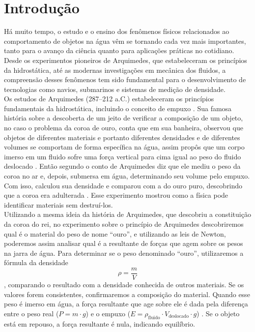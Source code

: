 \section{Introdução}

Há muito tempo, o estudo e o ensino dos fenômenos físicos relacionados ao
comportamento de objetos na água vêm se tornando cada vez mais importantes,
tanto para o avanço da ciência quanto para aplicações práticas no cotidiano.
Desde os experimentos pioneiros de Arquimedes, que estabeleceram os princípios
da hidrostática, até as modernas investigações em mecânica dos fluidos, a
compreensão desses fenômenos tem sido fundamental para o desenvolvimento de
tecnologias como navios, submarinos e sistemas de medição de densidade.\\

Os estudos de Arquimedes (287--212 a.C.) estabeleceram os princípios
fundamentais da hidrostática, incluindo o conceito de empuxo \cite{meneses2018}.
Sua famosa história sobre a descoberta de um jeito de verificar a composição de
um objeto, no caso o problema da coroa de ouro, conta que em sua banheira,
observou que objetos de diferentes materiais e portanto diferentes densidades e
de diferentes volumes se comportam de forma específica na água, assim propôs que
um corpo imerso em um fluido sofre uma força vertical para cima igual ao peso do
fluido deslocado \cite{nussenzveig2014}. Então segundo o conto de Arquimedes diz
que ele mediu o peso da coroa no ar e, depois, submersa em água, determinando
seu volume pelo empuxo. Com isso, calculou sua densidade e comparou com a do
ouro puro, descobrindo que a coroa era adulterada \cite{thompson2008}. Esse
experimento mostrou como a física pode identificar materiais sem destruí-los.\\

Utilizando a mesma ideia da história de Arquimedes, que descobriu a constituição
da coroa do rei, no experimento sobre o princípio de Arquimedes descobriremos
qual é o material do peso de nome ``ouro'', e utilizando as leis de Newton,
poderemos assim analisar qual é a resultante de forças que agem sobre os pesos
na jarra de água. Para determinar se o peso denominado ``ouro'', utilizaremos a
fórmula da densidade
\begin{equation}
	\rho = \frac{m}{V} \label{eq:densidade}
\end{equation}
\cite{nussenzveig2014}, comparando o resultado com a densidade conhecida de
outros materiais. Se os valores forem consistentes, confirmaremos a composição
do material. Quando esse peso é imerso em água, a força resultante que age sobre
ele é dada pela diferença entre o peso real ($P = m \cdot g$) e o empuxo ($E =
\rho_{\text{fluido}} \cdot V_{\text{deslocado}} \cdot g$)
\cite{nussenzveig2014}. Se o objeto está em repouso, a força resultante é nula,
indicando equilíbrio.\\

